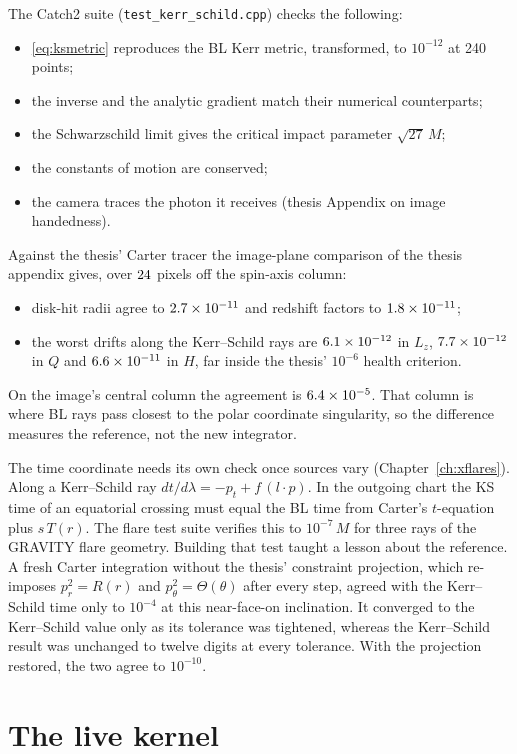 The Catch2 suite (\texttt{test\_kerr\_schild.cpp}) checks the following:
\begin{itemize}
\item \eqref{eq:ksmetric} reproduces the BL Kerr metric, transformed, to
$10^{-12}$ at 240 points;
\item the inverse and the analytic gradient match their numerical
counterparts;
\item the Schwarzschild limit gives the critical impact parameter
$\sqrt{27}\,M$;
\item the constants of motion are conserved;
\item the camera traces the photon it receives (thesis Appendix on image
handedness).
\end{itemize}
Against the thesis' Carter tracer the image-plane comparison of the thesis
appendix gives, over $24$ pixels off the spin-axis column:
\begin{itemize}
\item disk-hit radii agree to $2.7\times10^{-11}$ and redshift factors to
$1.8\times10^{-11}$;
\item the worst drifts along the Kerr--Schild rays are $6.1\times10^{-12}$ in
$L_z$, $7.7\times10^{-12}$ in $Q$ and $6.6\times10^{-11}$ in $H$, far inside the
thesis' $10^{-6}$ health criterion.
\end{itemize}
On the image's central column the agreement is $6.4\times10^{-5}$. That column
is where BL rays pass closest to the polar coordinate singularity, so the
difference measures the reference, not the new integrator.

The time coordinate needs its own check once sources vary (Chapter~\ref{ch:xflares}).
Along a Kerr--Schild ray $dt/d\lambda = -p_t + f\,(l\cdot p)$. In the outgoing
chart the KS time of an equatorial crossing must equal the BL time from
Carter's $t$-equation plus $s\,T(r)$. The flare test suite verifies this to
$10^{-7}\,M$ for three rays of the GRAVITY flare geometry. Building that test
taught a lesson about the reference. A fresh Carter integration without the
thesis' constraint projection, which re-imposes $p_r^2 = R(r)$ and
$p_\theta^2 = \Theta(\theta)$ after every step, agreed with the Kerr--Schild
time only to $10^{-4}$ at this near-face-on inclination. It converged to the
Kerr--Schild value only as its tolerance was tightened, whereas the
Kerr--Schild result was unchanged to twelve digits at every tolerance. With
the projection restored, the two agree to $10^{-10}$.

\section{The live kernel}

